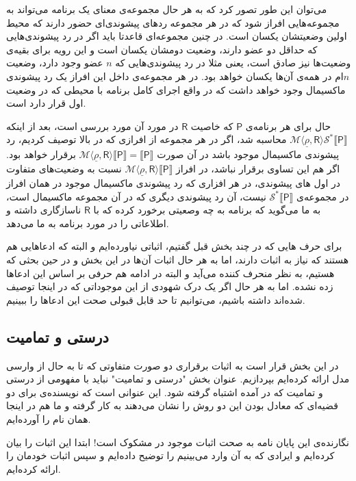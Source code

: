 می‌توان این طور تصور کرد که به هر حال مجموعه‌ی معنای یک برنامه می‌تواند به مجموعه‌هایی افراز شود که در هر مجموعه ردهای پیشوندی‌ای حضور دارند که محیط اولین وضعیتشان یکسان است. در چنین مجموعه‌ای قاعدتا باید اگر در رد پیشوندی‌هایی که حداقل دو عضو دارند، وضعیت دومشان یکسان است و این رویه برای بقیه‌ی وضعیت‌ها نیز صادق است، یعنی مثلا در رد پیشوندی‌هایی که $n$ عضو وجود دارد، وضعیت  $n$ام در همه‌ی آن‌ها یکسان خواهد بود. در هر مجموعه‌ی داخل این افراز یک رد پیشوندی ماکسیمال وجود خواهد داشت که در واقع اجرای کامل برنامه با محیطی که در وضعیت اول قرار دارد است.

حال برای هر برنامه‌ی $\mathsf{P}$ که خاصیت $\mathsf{R}$ در مورد آن مورد بررسی است، بعد از اینکه 
$\mathcal{M} \langle \underline{\rho}, \mathsf{R} \rangle \mathcal{S}^* \llbracket \mathsf{P} \rrbracket$
 محاسبه شد، اگر در هر مجموعه از افرازی که در بالا توصیف کردیم، رد پیشوندی ماکسیمال موجود باشد در آن صورت 
$\mathcal{M} \langle \underline{\rho}, \mathsf{R} \rangle \llbracket \mathsf{P} \rrbracket=
\llbracket \mathsf{P} \rrbracket $
برقرار خواهد بود. اگر هم این تساوی برقرار نباشد، در افراز
$\mathcal{M} \langle \underline{\rho}, \mathsf{R} \rangle \llbracket \mathsf{P} \rrbracket$
نسبت به وضعیت‌های متفاوت در اول های پیشوندی، در هر افزاری که رد پیشوندی ماکسیمال موجود در همان افراز در مجموعه‌ی 
$\mathcal{S}^* \llbracket \mathsf{P} \rrbracket $ 
نیست، آن رد پیشوندی دیگری که در آن مجموعه ماکسیمال است، به ما می‌گوید که برنامه به چه وصعیتی برخورد کرده که با $\mathsf{R}$ ناسازگاری داشته و اطلاعاتی را در مورد برنامه به ما می‌دهد.

برای حرف هایی که در چند بخش قبل گفتیم، اثباتی نیاورده‌ایم و البته که ادعاهایی هم هستند که نیاز به اثبات دارند، اما به هر حال اثبات آن‌ها در این بخش و در حین بحثی که هستیم، به نظر منحرف کننده می‌آید و البته در ادامه هم حرفی بر اساس این ادعاها زده نشده. اما به هر حال اگر یک درک شهودی از این موجوداتی که در اینجا توصیف شده‌اند داشته باشیم، می‌توانیم تا حد قابل قبولی صحت این ادعاها را ببینیم.


\subsection{درستی و تمامیت}

در این بخش قرار است به اثبات برقراری دو صورت متفاوتی که تا به حال از وارسی مدل ارائه کرده‌ایم بپردازیم. عنوان بخش "درستی و تمامیت" نباید با مفهومی از درستی و تمامیت که در \cite{statica} آمده اشتباه گرفته شود. این عنوانی است که نویسنده‌ی \cite{calcul} برای دو قضیه‌ای که معادل بودن این دو روش را نشان می‌دهند به کار گرفته و ما هم در اینجا همان نام را آورده‌ایم.

نگارنده‌ی این پایان نامه به صحت اثبات موجود در  \cite{calcul} مشکوک است! ابتدا این اثبات را بیان کرده‌ایم و ایرادی که به آن وارد می‌بینیم را توضیح داده‌ایم و سپس اثبات خودمان را ارائه کرده‌ایم.




